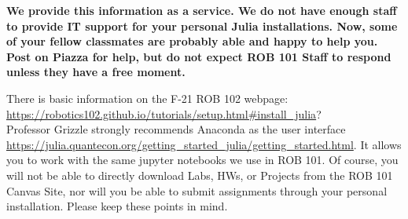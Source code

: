 

\begin{tcolorbox}[sharp corners, colback=pink!30, colframe=red!80!white, title=\textbf{\Large Warning!}]
\vspace*{1cm}
\bf \large We provide this information as a service. We do not have enough staff to provide IT support for your personal Julia installations. Now, some of your fellow classmates are probably able and happy to help you. Post on Piazza for help, but do not expect ROB 101 Staff to respond unless they have a free moment. 
\vspace*{1cm}
\end{tcolorbox}

\vspace*{1cm}

There is basic information on the F-21 ROB 102 webpage:  \url{https://robotics102.github.io/tutorials/setup.html#install_julia}? \\

Professor Grizzle strongly recommends Anaconda as the user interface \url{https://julia.quantecon.org/getting_started_julia/getting_started.html}. It allows you to work with the same jupyter notebooks we use in ROB 101. Of course, you will not be able to directly download Labs, HWs, or Projects from the ROB 101 Canvas Site, nor will you be able to submit assignments through your personal installation. Please keep these points in mind.   